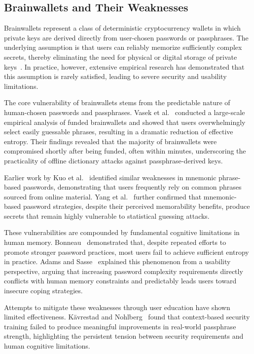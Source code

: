 \documentclass[journal,article,accept,pdftex,moreauthors]{Definitions/mdpi}
\begin{document}
\subsection{Brainwallets and Their Weaknesses}

Brainwallets represent a class of deterministic cryptocurrency wallets in which private keys are derived directly from user-chosen passwords or passphrases. The underlying assumption is that users can reliably memorize sufficiently complex secrets, thereby eliminating the need for physical or digital storage of private keys~\cite{Das2019, Vasek2017}. In practice, however, extensive empirical research has demonstrated that this assumption is rarely satisfied, leading to severe security and usability limitations.

The core vulnerability of brainwallets stems from the predictable nature of human-chosen passwords and passphrases. Vasek et al.~\cite{Vasek2017} conducted a large-scale empirical analysis of funded brainwallets and showed that users overwhelmingly select easily guessable phrases, resulting in a dramatic reduction of effective entropy. Their findings revealed that the majority of brainwallets were compromised shortly after being funded, often within minutes, underscoring the practicality of offline dictionary attacks against passphrase-derived keys.

Earlier work by Kuo et al.~\cite{Kuo2006} identified similar weaknesses in mnemonic phrase-based passwords, demonstrating that users frequently rely on common phrases sourced from online material. Yang et al.~\cite{Yang2016} further confirmed that mnemonic-based password strategies, despite their perceived memorability benefits, produce secrets that remain highly vulnerable to statistical guessing attacks.

These vulnerabilities are compounded by fundamental cognitive limitations in human memory. Bonneau~\cite{Bonneau2012,6234435} demonstrated that, despite repeated efforts to promote stronger password practices, most users fail to achieve sufficient entropy in practice. Adams and Sasse~\cite{Adams1999, Sasse2001} explained this phenomenon from a usability perspective, arguing that increasing password complexity requirements directly conflicts with human memory constraints and predictably leads users toward insecure coping strategies.

Attempts to mitigate these weaknesses through user education have shown limited effectiveness. Kävrestad and Nohlberg~\cite{Kavrestad2020} found that context-based security training failed to produce meaningful improvements in real-world passphrase strength, highlighting the persistent tension between security requirements and human cognitive limitations.
\end{document}
